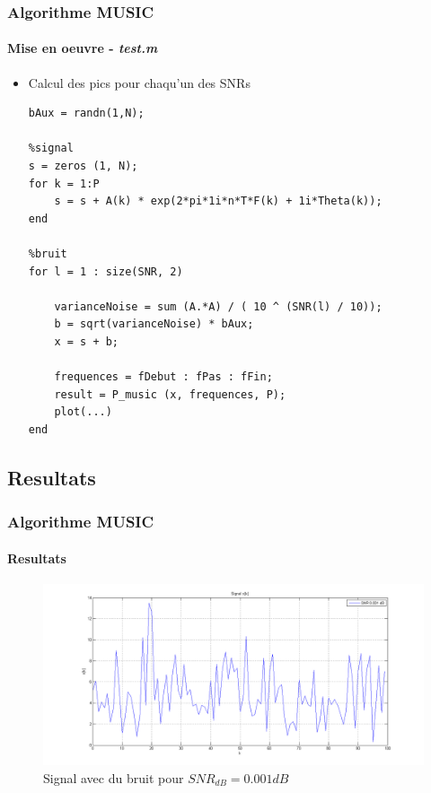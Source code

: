 \documentclass[10pt]{beamer}
\begin{document}
    
    \begin{frame}[fragile]
        \frametitle{Algorithme MUSIC}
        \framesubtitle{Mise en oeuvre - \textit{test.m}}
%       
%       
        \begin{itemize}

        \item Calcul des pics pour chaqu'un des SNRs
        
        \begin{lstlisting}
bAux = randn(1,N);

%signal
s = zeros (1, N); 
for k = 1:P
    s = s + A(k) * exp(2*pi*1i*n*T*F(k) + 1i*Theta(k));
end

%bruit
for l = 1 : size(SNR, 2)

    varianceNoise = sum (A.*A) / ( 10 ^ (SNR(l) / 10));
    b = sqrt(varianceNoise) * bAux;
    x = s + b;
    
    frequences = fDebut : fPas : fFin;
    result = P_music (x, frequences, P);
    plot(...)
end
        \end{lstlisting} 
        
        \end{itemize}
\end{frame}


    
    \subsection{Resultats} 
    
    \begin{frame}
        \frametitle{Algorithme MUSIC}
        \framesubtitle{Resultats}
        
        \begin{figure}[h]
            \centering
            \includegraphics[scale= 0.28 ]{images/wave0001}
            \caption{Signal avec du bruit pour \(SNR_{dB} = 0.001 dB\)}
            \label{fig:snr0001}
        \end{figure}
        
    \end{frame}
    
\end{document}
